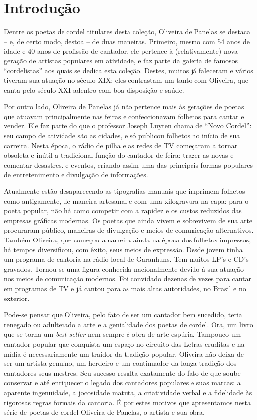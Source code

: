 
\chapter[Introdução, por Maurice Van Woensel]{Introdução}

Dentre os poetas de cordel titulares desta coleção,
Oliveira de Panelas se destaca -- e, de certo modo, destoa
{}-- de duas maneiras. Primeiro, mesmo com 54 anos de
idade e 40 anos de profissão de cantador, ele pertence à
(relativamente) nova geração de artistas populares em
atividade, e faz parte da galeria de famosos
``cordelistas'' aos quais se dedica esta coleção. Destes, muitos já faleceram
e vários tiveram sua atuação no século XIX: eles contrastam
um tanto com Oliveira, que canta pelo século XXI adentro
com boa disposição e saúde.

Por outro lado, Oliveira de Panelas já não pertence mais
às gerações de poetas que atuavam principalmente nas
feiras e confeccionavam folhetos para cantar e vender. Ele
faz parte do que o professor Joseph Luyten chama de ``Novo
Cordel'': seu campo de atividade são as cidades, e só
publicou folhetos no início de sua carreira. Nesta época, o
rádio de pilha e as redes de TV começaram a tornar
obsoleta e inútil a tradicional função do cantador de feira:
trazer as novas e comentar desastres. e eventos, criando
assim uma das principais formas populares de
entretenimento e divulgação de informações.

Atualmente estão desaparecendo as tipografias manuais
que imprimem folhetos como antigamente, de maneira
artesanal e com uma xilogravura na capa: para o poeta
popular, não há como competir com a rapidez e os custos
reduzidos das empresas gráficas modernas. Os poetas que
ainda vivem e sobrevivem de sua arte procuraram público,
maneiras de divulgação e meios de comunicação
alternativos. Também Oliveira, que começou a carreira
ainda na época dos folhetos impressos, há tempos
diversificou, com êxito, seus meios de expressão. Desde
jovem tinha um programa de cantoria na rádio local de
Garanhuns. Tem muitos LP's e CD's
gravados. Tornou-se
uma figura conhecida nacionalmente devido à sua atuação
nos meios de comunicação modernos. Foi convidado
dezenas de vezes para cantar em programas de TV e já
cantou para as mais altas autoridades, no Brasil e no
exterior.

Pode-se pensar que Oliveira, pelo fato de ser um
cantador bem sucedido, teria renegado ou adulterado a arte
e a genialidade dos poetas de cordel. Ora, um livro que se
torna um \textit{best-seller} nem sempre é obra de arte espúria.
Tampouco um cantador popular que conquista um espaço
no circuito das Letras eruditas e na mídia é
necessariamente um traidor da tradição popular. Oliveira
não deixa de ser um artista genuíno, um herdeiro e um
continuador da longa tradição dos cantadores seus mestres.
Seu sucesso resulta exatamente do fato de que soube
conservar e até enriquecer o legado dos cantadores
populares e suas marcas: a aparente ingenuidade, a
jocosidade matuta, a criatividade verbal e a fidelidade às
rigorosas regras formais da cantoria. É por estes motivos
que apresentamos nesta série de poetas de cordel Oliveira
de Panelas, o artista e sua obra.

